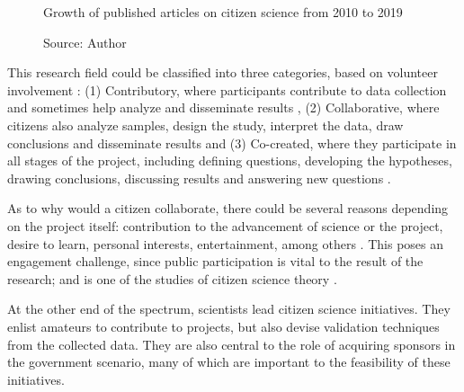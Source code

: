 \begin{figure}[h]
    \centering
    \caption{Growth of published articles on citizen science from 2010 to 2019}
    \label{fig:growth-publications}
    \caption*{Source: Author}
\end{figure}

This research field could be classified into three categories, based on volunteer involvement \cite{follett2015analysis}: (1) Contributory, where participants contribute to data collection and sometimes help analyze and disseminate results \cite{bonney2009citizen}, (2) Collaborative, where citizens also analyze samples, design the study, interpret the data, draw conclusions and disseminate results \cite{faridani2009networked} and (3) Co-created, where they participate in all stages of the project, including defining questions, developing the hypotheses, drawing conclusions, discussing results and answering new questions \cite{hill2012notes}.

As to why would a citizen collaborate, there could be several reasons depending on the project itself: contribution to the advancement of science or the project, desire to learn, personal interests, entertainment, among others \cite{tinati2016because}. This poses an engagement challenge, since public participation is vital to the result of the research; and is one of the studies of citizen science theory \cite{bowser2013using}.

At the other end of the spectrum, scientists lead citizen science initiatives. They enlist amateurs to contribute to projects, but also devise validation techniques from the collected data. They are also central to the role of acquiring sponsors in the government scenario, many of which are important to the feasibility of these initiatives.

